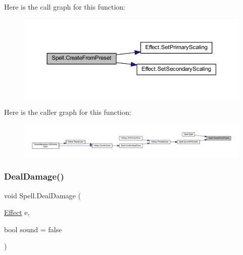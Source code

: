 Here is the call graph for this function\+:\nopagebreak
\begin{figure}[H]
\begin{center}
\leavevmode
\includegraphics[width=350pt]{class_spell_aee08370358e033af2bf7e0c4c2f2b2bd_cgraph}
\end{center}
\end{figure}
Here is the caller graph for this function\+:\nopagebreak
\begin{figure}[H]
\begin{center}
\leavevmode
\includegraphics[width=350pt]{class_spell_aee08370358e033af2bf7e0c4c2f2b2bd_icgraph}
\end{center}
\end{figure}
\mbox{\label{class_spell_ad2e4f64f1f7ced4b69c55619d5fdb0b0}} 
\subsubsection{\texorpdfstring{DealDamage()}{DealDamage()}}
{\footnotesize\ttfamily void Spell.\+Deal\+Damage (\begin{DoxyParamCaption}\item[{\mbox{\hyperlink{class_effect}{Effect}}}]{e,  }\item[{bool}]{sound = {\ttfamily false} }\end{DoxyParamCaption})}

